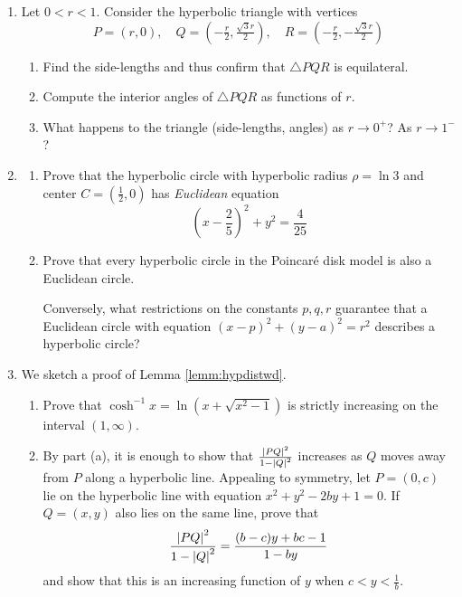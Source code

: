 \begin{exercises}
\begin{enumerate}
		\item Let $0<r<1$. Consider the hyperbolic triangle with vertices
		\[
			P=\left(r,0\right),\quad 
			Q=\left(-\tfrac r2,\tfrac{\sqrt 3r}2\right),\quad 
			R=\left(-\tfrac r2,-\tfrac{\sqrt 3r}2\right)
		\]\vspace{-4pt}
		\begin{enumerate}
		  \item Find the side-lengths and thus confirm that $\triangle PQR$ is equilateral.
		  \item Compute the interior angles of $\triangle PQR$ as functions of $r$.
		  \item What happens to the triangle (side-lengths, angles) as $r\to 0^+$? As $r\to 1^-$?
		\end{enumerate}
		
		\item\label{exs:circhypcirc}\begin{enumerate}
	    \item Prove that the hyperbolic circle with hyperbolic radius $\rho=\ln 3$ and center $C=(\frac 12,0)$ has \emph{Euclidean} equation
	    \[
	    	\left(x-\frac 25\right)^2+y^2=\frac 4{25}
	    \]
	    \item Prove that every hyperbolic circle in the Poincaré disk model is also a Euclidean circle.\par
	    Conversely, what restrictions on the constants $p,q,r$ guarantee that a Euclidean circle with equation $(x-p)^2+(y-a)^2=r^2$ describes a hyperbolic circle?
	  \end{enumerate}
		
		\item We sketch a proof of Lemma \ref{lemm:hypdistwd}. 
		\begin{enumerate}
		  \item Prove that $\cosh^{-1}x=\ln(x+\sqrt{x^2-1})$ is strictly increasing on the interval $(1,\infty)$.
		  \item By part (a), it is enough to show that $\frac{\left| PQ\right|^2}{1-\left| Q\right|^2}$ increases as $Q$ moves away from $P$ along a hyperbolic line. Appealing to symmetry, let $P=(0,c)$ lie on the hyperbolic line with equation $x^2+y^2-2by+1=0$. If $Q=(x,y)$ also lies on the same line, prove that
		  \[
		  	\frac{\left| PQ\right|^2}{1-\left| Q\right|^2}=\frac{(b-c)y+bc-1}{1-by}
		  \]
		  and show that this is an increasing function of $y$ when $c<y<\frac 1b$.
		\end{enumerate} 
		

	\end{enumerate}
\end{exercises}

